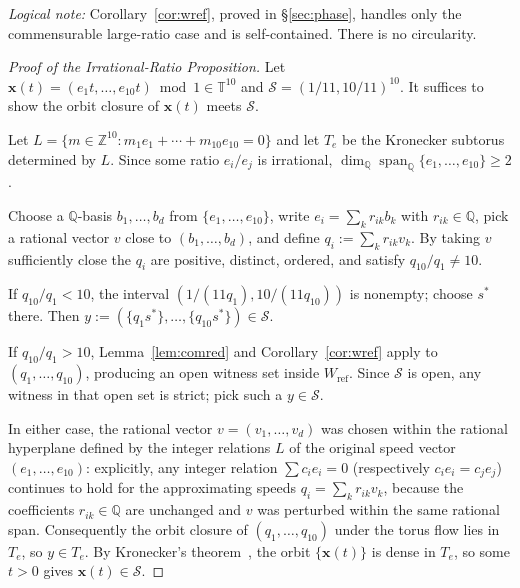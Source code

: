 \documentclass[12pt,a4paper]{amsart}
\theoremstyle{definition}
\theoremstyle{remark}
\newcommand{\Wref}{W_{\mathrm{ref}}}
\begin{document}
\noindent\textit{Logical note:} Corollary~\ref{cor:wref}, proved in \S\ref{sec:phase},
handles only the commensurable large-ratio case and is self-contained. There is no
circularity.

\begin{proof}[Proof of the Irrational-Ratio Proposition]
Let $\mathbf{x}(t)=(e_1t,\ldots,e_{10}t)\bmod 1\in\mathbb{T}^{10}$ and
$\mathcal{S}=(1/11,10/11)^{10}$. It suffices to show the orbit closure of $\mathbf{x}(t)$
meets $\mathcal{S}$.

Let $L=\{m\in\mathbb{Z}^{10}:m_1e_1+\cdots+m_{10}e_{10}=0\}$ and let $T_e$ be the
Kronecker subtorus determined by $L$. Since some ratio $e_i/e_j$ is irrational,
$\dim_{\mathbb{Q}}\operatorname{span}_{\mathbb{Q}}\{e_1,\ldots,e_{10}\}\ge 2$.

Choose a $\mathbb{Q}$-basis $b_1,\ldots,b_d$ from $\{e_1,\ldots,e_{10}\}$, write
$e_i=\sum_{k}r_{ik}b_k$ with $r_{ik}\in\mathbb{Q}$, pick a rational vector $v$ close to
$(b_1,\ldots,b_d)$, and define $q_i:=\sum_k r_{ik}v_k$. By taking $v$ sufficiently close
the $q_i$ are positive, distinct, ordered, and satisfy $q_{10}/q_1\ne 10$.

If $q_{10}/q_1<10$, the interval $(1/(11q_1),10/(11q_{10}))$ is nonempty; choose $s^*$
there. Then $y:=(\{q_1s^*\},\ldots,\{q_{10}s^*\})\in\mathcal{S}$.

If $q_{10}/q_1>10$, Lemma~\ref{lem:comred} and Corollary~\ref{cor:wref} apply to
$(q_1,\ldots,q_{10})$, producing an open witness set inside $\Wref$. Since $\mathcal{S}$
is open, any witness in that open set is strict; pick such a $y\in\mathcal{S}$.

In either case, the rational vector $v=(v_1,\ldots,v_d)$ was chosen within the rational
hyperplane defined by the integer relations $L$ of the original speed vector $(e_1,\ldots,e_{10})$:
explicitly, any integer relation $\sum c_i e_i=0$ (respectively $c_ie_i=c_je_j$) continues
to hold for the approximating speeds $q_i=\sum_k r_{ik}v_k$, because the coefficients
$r_{ik}\in\mathbb{Q}$ are unchanged and $v$ was perturbed within the same rational span.
Consequently the orbit closure of $(q_1,\ldots,q_{10})$ under the torus flow lies in $T_e$,
so $y\in T_e$.
By Kronecker's theorem~\cite{KN74}, the orbit $\{\mathbf{x}(t)\}$ is dense in $T_e$,
so some $t>0$ gives $\mathbf{x}(t)\in\mathcal{S}$.
\end{proof}
\end{document}
